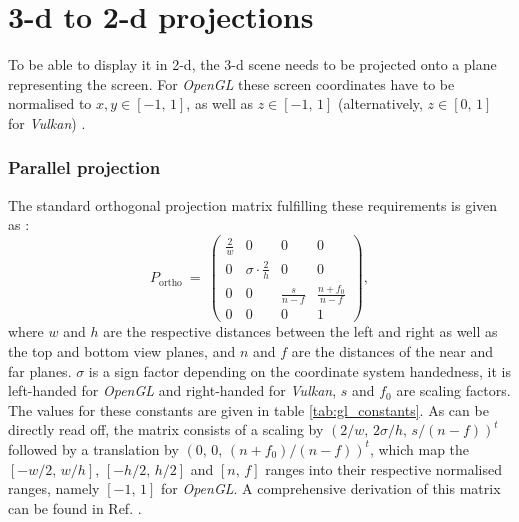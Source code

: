 \section{3-d to 2-d projections}
\label{sec:gl_projs}
To be able to display it in 2-d, the 3-d scene needs to be projected onto a plane representing the screen.
For \textit{OpenGL} these screen coordinates have to be normalised to $x, y \in \left[-1,\, 1\right]$,
as well as $z \in \left[-1,\, 1\right]$ (alternatively, $z \in \left[0,\, 1\right]$ for \textit{Vulkan}) 
\cite{web_QVulkanWindow}.

\subsubsection{Parallel projection}
The standard orthogonal projection matrix fulfilling these requirements is given as
\cite{web_gl_ortho} \cite[p. 82]{Sellers2002}:
\begin{equation}
	P_{\mathrm{ortho}} \ =\
		\left( \begin{array}{cccc}
			\frac{2}{w} &                           0 &              0 &  0                  \\
			          0 &  \sigma \cdot \frac{2}{h} &              0 &  0                  \\
			          0 &                           0 &  \frac{s}{n-f} &  \frac{n+f_0}{n-f}  \\
			          0 &                           0 &              0 &  1
		\end{array} \right),
\end{equation}
where $w$ and $h$ are the respective distances between the left and right as well as the top and bottom 
view planes, and $n$ and $f$ are the distances of the near and far planes.
$\sigma$ is a sign factor depending on the coordinate system handedness, it is left-handed for
\textit{OpenGL} and right-handed for \textit{Vulkan},
$s$ and $f_0$ are scaling factors. The values for these constants are given in table \ref{tab:gl_constants}.
As can be directly read off, the matrix consists of a scaling by
$\left(2/w, \, 2\sigma/h, \, s/(n-f) \right)^t$
followed by a translation by $\left( 0, \, 0, \, (n+f_0)/(n-f) \right)^t$,
which map the $\left[-w/2, \, w/h\right]$, $\left[-h/2, \, h/2\right]$ and $\left[n,\,f\right]$ ranges into their respective
normalised ranges, namely $\left[-1,\, 1\right]$ for \textit{OpenGL}.
A comprehensive derivation of this matrix can be found in Ref. \cite{web_webgl_ortho}.




